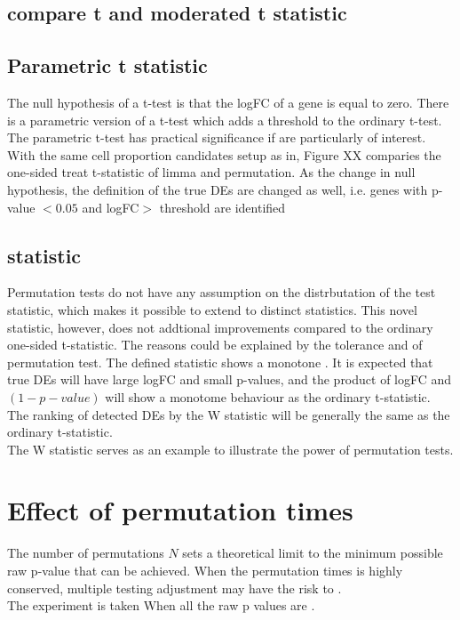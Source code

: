 \subsection{compare t and moderated t statistic}
\subsection{Parametric t statistic}
The null hypothesis of a t-test is that the logFC of a gene is equal to zero. There is a parametric version of a t-test which adds a threshold to the ordinary t-test. The parametric t-test has practical significance if are particularly of interest. \\
With the same cell proportion candidates setup as in, Figure XX comparies the one-sided treat t-statistic of limma and permutation. As the change in null hypothesis, the definition of the true DEs are changed as well, i.e. genes with p-value $< 0.05 $ and logFC$>$ threshold are identified 
\subsection{ statistic}
Permutation tests do not have any assumption on the distrbutation of the test statistic, which makes it possible to extend to distinct statistics. 
This novel statistic, however, does not addtional improvements compared to the ordinary one-sided t-statistic. The reasons could be explained by the tolerance and of permutation test. The defined statistic shows a monotone . It is expected that true DEs will have large logFC and small p-values, and the product of logFC and $(1-p-value)$ will show a monotome behaviour as the ordinary t-statistic. The ranking of detected DEs by the W statistic will be generally the same as the ordinary t-statistic. \\
The W statistic serves as an example to illustrate the power of permutation tests. 
\section{Effect of permutation times}
The number of permutations $N$ sets a theoretical limit to the minimum possible raw p-value that can be achieved. When the permutation times is highly conserved, multiple testing adjustment may have the risk to . \\
The experiment is taken 
When all the raw p values are . 
